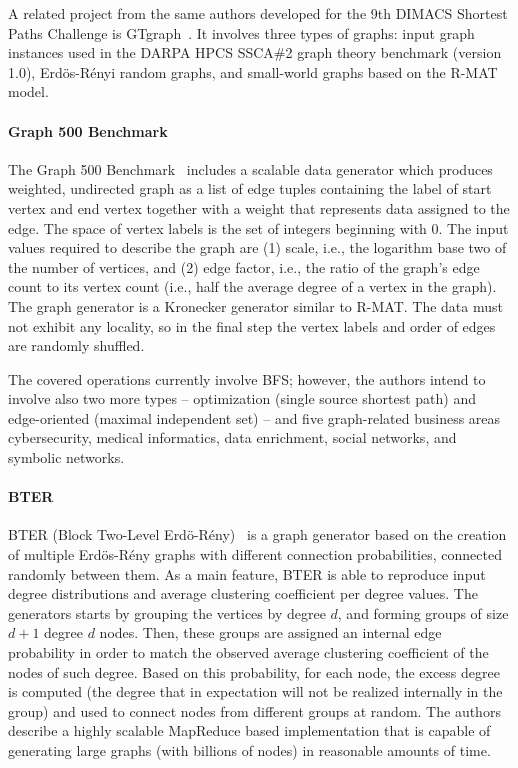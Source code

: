 A related project from the same authors developed for the 9th DIMACS Shortest
Paths Challenge is GTgraph~\cite{GTgraph}. It involves three types of graphs:
input graph instances used in the DARPA HPCS SSCA\#2 graph theory benchmark
(version 1.0), Erd\"{o}s-R\'{e}nyi random graphs, and small-world graphs based
on the R-MAT model.


\paragraph{Graph 500 Benchmark} The Graph 500 Benchmark~\cite{Graph500} includes
a scalable data generator which produces weighted, undirected graph as a list of
edge tuples containing the label of start vertex and end vertex together with a
weight that represents data assigned to the edge. The space of vertex  labels is
the set of integers beginning with 0. The input values required to describe the
graph are (1) scale, i.e., the logarithm base two of the number of vertices, and
(2) edge factor, i.e., the ratio of the graph's edge count to its vertex count
(i.e., half the average degree of a vertex in the graph). The graph generator is
a Kronecker generator similar to R-MAT. The data must not exhibit any locality,
so in the final step the vertex labels and order of edges are randomly shuffled.

The covered operations currently involve BFS; however, the authors intend to
involve also two more types -- optimization (single source shortest path) and
edge-oriented (maximal independent set) -- and five graph-related business areas
cybersecurity, medical informatics, data enrichment, social networks, and
symbolic networks.

\paragraph{BTER} BTER (Block Two-Level
Erd\"{o}-R\'{e}ny)~\cite{kolda2014scalable} is a graph generator based on the
creation of multiple Erd\"{o}s-R\'{e}ny graphs with different connection
probabilities, connected randomly between them. As a main feature, BTER is able
to reproduce input degree distributions and average clustering
coefficient per degree values. The generators starts by grouping the vertices
by degree $d$, and forming groups of size $d+1$ degree $d$ nodes. Then, these
groups are assigned an internal edge probability in order to match the observed
average clustering coefficient of the nodes of such degree. Based on this
probability, for each node, the excess degree is computed (the degree that in
expectation will not be realized internally in the group) and used to connect
nodes from different groups at random. The authors describe a highly scalable
MapReduce based implementation that is capable of generating large graphs (with
billions of nodes) in reasonable amounts of time. 

